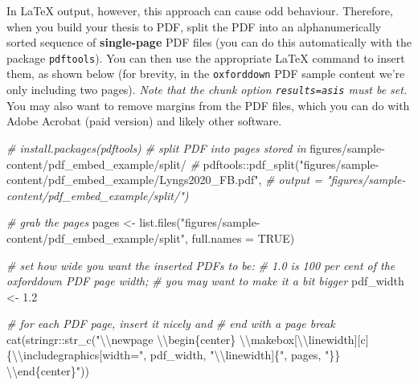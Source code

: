 \documentclass[a4paper, nobind]{templates/ociamthesis}
\newenvironment{Shaded}{\begin{snugshade}}{\end{snugshade}}
\newcommand{\AttributeTok}[1]{\textcolor[rgb]{0.77,0.63,0.00}{#1}}
\newcommand{\CommentTok}[1]{\textcolor[rgb]{0.56,0.35,0.01}{\textit{#1}}}
\newcommand{\ConstantTok}[1]{\textcolor[rgb]{0.00,0.00,0.00}{#1}}
\newcommand{\FloatTok}[1]{\textcolor[rgb]{0.00,0.00,0.81}{#1}}
\newcommand{\FunctionTok}[1]{\textcolor[rgb]{0.00,0.00,0.00}{#1}}
\newcommand{\NormalTok}[1]{#1}
\newcommand{\OtherTok}[1]{\textcolor[rgb]{0.56,0.35,0.01}{#1}}
\newcommand{\SpecialCharTok}[1]{\textcolor[rgb]{0.00,0.00,0.00}{#1}}
\newcommand{\StringTok}[1]{\textcolor[rgb]{0.31,0.60,0.02}{#1}}
\renewenvironment{Shaded}
{
  \vspace{10pt}%
  \begin{snugshade}%
}{%
  \end{snugshade}%
  \vspace{8pt}%
}
\begin{document}
In LaTeX output, however, this approach can cause odd behaviour.
Therefore, when you build your thesis to PDF, split the PDF into an alphanumerically sorted sequence of \textbf{single-page} PDF files (you can do this automatically with the package \texttt{pdftools}). You can then use the appropriate LaTeX command to insert them, as shown below (for brevity, in the \texttt{oxforddown} PDF sample content we're only including two pages).
\emph{Note that the chunk option \texttt{results=\textquotesingle{}asis\textquotesingle{}} must be set.}
You may also want to remove margins from the PDF files, which you can do with Adobe Acrobat (paid version) and likely other software.

\begin{Shaded}
\begin{Highlighting}[]
\CommentTok{\# install.packages(pdftools)}
\CommentTok{\# split PDF into pages stored in}
\NormalTok{    figures}\SpecialCharTok{/}\NormalTok{sample}\SpecialCharTok{{-}}\NormalTok{content}\SpecialCharTok{/}\NormalTok{pdf\_embed\_example}\SpecialCharTok{/}\NormalTok{split}\SpecialCharTok{/}
\CommentTok{\#}
\NormalTok{    pdftools}\SpecialCharTok{::}\FunctionTok{pdf\_split}\NormalTok{(}\StringTok{"figures/sample{-}content/pdf\_embed\_example/Lyngs2020\_FB.pdf"}\NormalTok{,}
\CommentTok{\# output = "figures/sample{-}content/pdf\_embed\_example/split/")}

\CommentTok{\# grab the pages}
\NormalTok{pages }\OtherTok{\textless{}{-}} \FunctionTok{list.files}\NormalTok{(}\StringTok{"figures/sample{-}content/pdf\_embed\_example/split"}\NormalTok{,}
    \AttributeTok{full.names =} \ConstantTok{TRUE}\NormalTok{)}

\CommentTok{\# set how wide you want the inserted PDFs to be:}
\CommentTok{\# 1.0 is 100 per cent of the oxforddown PDF page width;}
\CommentTok{\# you may want to make it a bit bigger}
\NormalTok{pdf\_width }\OtherTok{\textless{}{-}} \FloatTok{1.2}

\CommentTok{\# for each PDF page, insert it nicely and}
\CommentTok{\# end with a page break}
\FunctionTok{cat}\NormalTok{(stringr}\SpecialCharTok{::}\FunctionTok{str\_c}\NormalTok{(}\StringTok{"}\SpecialCharTok{\textbackslash{}\textbackslash{}}\StringTok{newpage }\SpecialCharTok{\textbackslash{}\textbackslash{}}\StringTok{begin\{center\}}
\StringTok{    }\SpecialCharTok{\textbackslash{}\textbackslash{}}\StringTok{makebox[}\SpecialCharTok{\textbackslash{}\textbackslash{}}\StringTok{linewidth][c]\{}\SpecialCharTok{\textbackslash{}\textbackslash{}}\StringTok{includegraphics[width="}\NormalTok{, pdf\_width,}
    \StringTok{"}\SpecialCharTok{\textbackslash{}\textbackslash{}}\StringTok{linewidth]\{"}\NormalTok{, pages, }\StringTok{"\}\} }\SpecialCharTok{\textbackslash{}\textbackslash{}}\StringTok{end\{center\}"}\NormalTok{))}
\end{Highlighting}
\end{Shaded}
\end{document}
